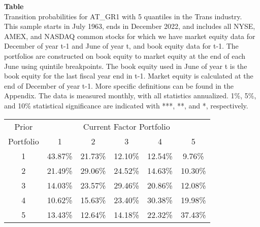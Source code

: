 \begin{table*}[ht!]
\raggedright
{}
\label{tab: transition_probs_AT_GR1_Trans_with_5_quantiles}
\textbf{Table \thetable} \\
Transition probabilities for AT_GR1 with 5 quantiles in the Trans industry. \\
\hspace*{1em}This sample starts in July 1963, ends in December 2022, and includes all NYSE, AMEX, and NASDAQ common stocks for which we have market equity data for December of year t-1 and June of year t, and book equity data for t-1. The portfolios are constructed on book equity to market equity at the end of each June using quintile breakpoints.  The book equity used in June of year t is the book equity for the last fiscal year end in t-1.  Market equity is calculated at the end of December of year t-1.  More specific definitions can be found in the Appendix.  The data is measured monthly, with all statistics annualized.  1\%, 5\%, and 10\% statistical significance are indicated with ***, **, and *, respectively. \\
\vspace{0.5em}
\centering
\begin{adjustbox}{max width=\textwidth}
\begin{tabular}{@{}cccccc@{}}
\toprule
Prior & \multicolumn{5}{c}{Current Factor Portfolio} \\
Portfolio & 1 & 2 & 3 & 4 & 5 \\
\midrule
1 & 43.87\% & 21.73\% & 12.10\% & 12.54\% & 9.76\% \\
2 & 21.49\% & 29.06\% & 24.52\% & 14.63\% & 10.30\% \\
3 & 14.03\% & 23.57\% & 29.46\% & 20.86\% & 12.08\% \\
4 & 10.62\% & 15.63\% & 23.40\% & 30.38\% & 19.98\% \\
5 & 13.43\% & 12.64\% & 14.18\% & 22.32\% & 37.43\% \\
\bottomrule
\end{tabular}
\end{adjustbox}
\end{table*}